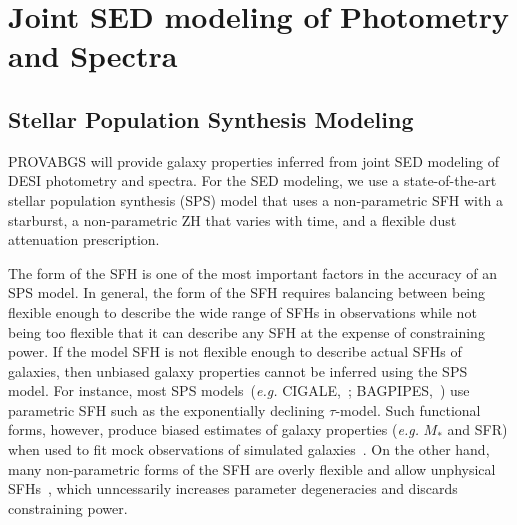 \section{Joint SED modeling of Photometry and Spectra} \label{sec:methods}
\subsection{Stellar Population Synthesis Modeling} \label{sec:sps} 
PROVABGS will provide galaxy properties inferred from joint SED modeling of
DESI photometry and spectra. 
For the SED modeling, we use a state-of-the-art stellar population synthesis
(SPS) model that uses a non-parametric SFH with a starburst, a non-parametric
ZH that varies with time, and a flexible dust attenuation prescription. 

The form of the SFH is one of the most important factors in the accuracy of an
SPS model.
In general, the form of the SFH requires balancing between being flexible enough
to describe the wide range of SFHs in observations while not being too flexible
that it can describe any SFH at the expense of constraining power.  
If the model SFH is not flexible enough to describe actual SFHs of galaxies,
then unbiased galaxy properties cannot be inferred using the SPS model. 
For instance, most SPS models~(\emph{e.g.} CIGALE,~\citealt{serra2011,
boquien2019}; BAGPIPES,~\citealt{carnall2017}) use parametric SFH such as the
exponentially declining $\tau$-model.
Such functional forms, however, produce biased estimates of galaxy properties
(\emph{e.g.} $M_*$ and SFR) when used to fit mock observations of simulated 
galaxies~\citep{simha2014, pacifici2015, ciesla2017, carnall2018}.
On the other hand, many non-parametric forms of the SFH are overly flexible
and allow unphysical SFHs~\citep{leja2019}, which unncessarily increases 
parameter degeneracies and discards constraining power. 


